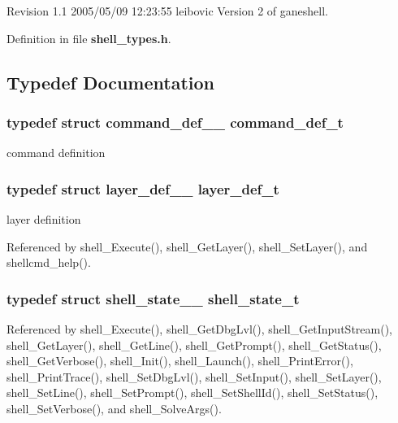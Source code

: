 Revision 1.1 2005/05/09 12:23:55 leibovic Version 2 of ganeshell.

Definition in file {\bf shell\_\-types.h}.

\subsection{Typedef Documentation}
\subsubsection{\setlength{\rightskip}{0pt plus 5cm}typedef struct {\bf command\_\-def\_\-\_\-}  {\bf command\_\-def\_\-t}}\label{shell__types_8h_a0}


command definition 
\subsubsection{\setlength{\rightskip}{0pt plus 5cm}typedef struct {\bf layer\_\-def\_\-\_\-}  {\bf layer\_\-def\_\-t}}\label{shell__types_8h_a1}


layer definition 

Referenced by shell\_\-Execute(), shell\_\-Get\-Layer(), shell\_\-Set\-Layer(), and shellcmd\_\-help().
\subsubsection{\setlength{\rightskip}{0pt plus 5cm}typedef struct {\bf shell\_\-state\_\-\_\-}  {\bf shell\_\-state\_\-t}}\label{shell__types_8h_a2}




Referenced by shell\_\-Execute(), shell\_\-Get\-Dbg\-Lvl(), shell\_\-Get\-Input\-Stream(), shell\_\-Get\-Layer(), shell\_\-Get\-Line(), shell\_\-Get\-Prompt(), shell\_\-Get\-Status(), shell\_\-Get\-Verbose(), shell\_\-Init(), shell\_\-Launch(), shell\_\-Print\-Error(), shell\_\-Print\-Trace(), shell\_\-Set\-Dbg\-Lvl(), shell\_\-Set\-Input(), shell\_\-Set\-Layer(), shell\_\-Set\-Line(), shell\_\-Set\-Prompt(), shell\_\-Set\-Shell\-Id(), shell\_\-Set\-Status(), shell\_\-Set\-Verbose(), and shell\_\-Solve\-Args().